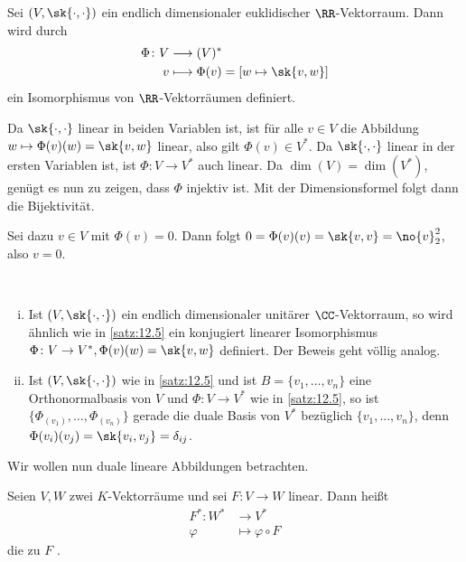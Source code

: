 \begin{satz}
	\label{satz:12.5}
	Sei $(V,\sk{\cdot,\cdot})$ ein endlich dimensionaler euklidischer $\RR$-Vektorraum.
	Dann wird durch
	\begin{align*}
		\Phi \colon V &\longrightarrow (V)^* \\
		v &\longmapsto \Phi(v) = [w \mapsto \sk{v,w}]
	\end{align*}
	ein Isomorphismus von $\RR$-Vektorräumen definiert.
\end{satz}

\begin{beweis}
	Da $\sk{\cdot,\cdot}$ linear in beiden Variablen ist, ist für alle $v \in V$ die Abbildung $w \mapsto \Phi(v)(w) = \sk{v,w}$ linear, also gilt $\Phi(v) \in V^*$.
	Da $\sk{\cdot,\cdot}$ linear in der ersten Variablen ist, ist $\Phi \colon V \rightarrow V^*$ auch linear.
	Da $\dim(V) = \dim(V^*)$, genügt es nun zu zeigen, dass $\Phi$ injektiv ist.
	Mit der Dimensionsformel folgt dann die Bijektivität.
	
	Sei dazu $v \in V$ mit $\Phi(v) = 0$.
	Dann folgt $0 = \Phi(v)(v) = \sk{v,v} = \no{v}_2^2$, also $v = 0$. \qedhere
	\qedhere
\end{beweis}

\begin{bemerkung}
	\label{bem:12.6}
	\mbox{} \\[-1.4cm]
	\begin{enumerate}[(i)]
		\item Ist $(V,\sk{\cdot,\cdot})$ ein endlich dimensionaler unitärer $\CC$-Vektorraum, so wird ähnlich wie in \autoref{satz:12.5} ein konjugiert linearer Isomorphismus $\Phi \colon V \rightarrow V^*, \Phi(v)(w) = \sk{v,w}$ definiert.
		Der Beweis geht völlig analog.
		\item Ist $(V,\sk{\cdot,\cdot})$ wie in \autoref{satz:12.5} und ist $B = \{v_1,\dots,v_n\}$ eine Orthonormalbasis von $V$ und $\Phi \colon V \rightarrow V^*$ wie in \autoref{satz:12.5}, so ist $\{\Phi_(v_1),\dots,\Phi_(v_n)\}$ gerade die duale Basis von $V^*$ bezüglich $\{v_1,\dots,v_n\}$, denn $\Phi(v_i)(v_j) = \sk{v_i,v_j} = \delta_{ij}$.
	\end{enumerate}
\end{bemerkung}

Wir wollen nun duale lineare Abbildungen betrachten.

\begin{definition}
	\label{def:12.7}
	Seien $V,W$ zwei $K$-Vektorräume und sei $F \colon V \rightarrow W$ linear.
	Dann heißt
	\begin{align*}
		F^*\colon W^* &\longrightarrow V^* \\
		\varphi &\longmapsto \varphi \circ F
	\end{align*}
	die zu $F$ .
\end{definition}

